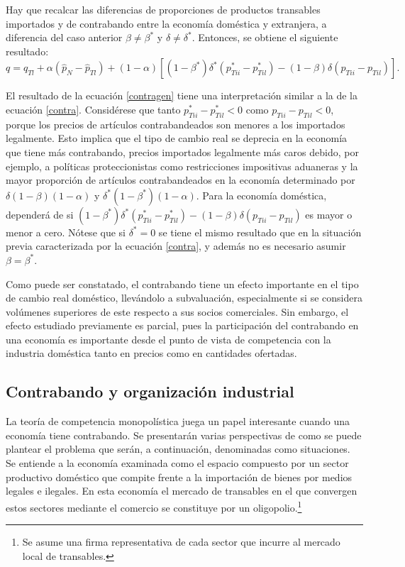 \documentclass[12pt,letterpaper]{article}
\begin{document}

Hay que recalcar las diferencias de proporciones de productos transables importados y de contrabando entre la economía doméstica y extranjera, a diferencia del caso anterior $\beta \neq \beta^*$ y $\delta \neq \delta^*$. Entonces, se obtiene el siguiente resultado:
\begin{equation}\label{contragen}
q=q_{Tl}+\alpha (\hat{p}_{N} - \hat{p}_{Tl}) + (1-\alpha)[(1-\beta^*)\delta^* (p_{Tii}^*-p_{Til}^*)-(1-\beta)\delta (p_{Tii}-p_{Til})].
\end{equation}

El resultado de la ecuación \ref{contragen} tiene una interpretación similar a la de la ecuación \ref{contra}. Considérese que tanto $p_{Tii}^*-p_{Til}^*<0$ como $p_{Tii}-p_{Til}<0$, porque los precios de artículos contrabandeados son menores a los importados legalmente. Esto implica que el tipo de cambio real se deprecia en la economía que tiene más contrabando, precios importados legalmente más caros debido, por ejemplo, a políticas proteccionistas como restricciones impositivas aduaneras y la mayor proporción de artículos contrabandeados en la economía determinado por $\delta(1-\beta)(1-\alpha)$ y $\delta^*(1-\beta^*)(1-\alpha)$. Para la economía doméstica, dependerá de si $(1-\beta^*)\delta^* (p_{Tii}^*-p_{Til}^*)-(1-\beta)\delta (p_{Tii}-p_{Til})$ es mayor o menor a cero. Nótese que si $\delta^*=0$ se tiene el mismo resultado que en la situación previa caracterizada por la ecuación \ref{contra}, y además no es necesario asumir $\beta=\beta^*$.

Como puede ser constatado, el contrabando tiene un efecto importante en el tipo de cambio real doméstico, llevándolo a subvaluación, especialmente si se considera volúmenes superiores de este respecto a sus socios comerciales. Sin embargo, el efecto estudiado previamente es parcial, pues la participación del contrabando en una economía es importante desde el punto de vista de competencia con la industria doméstica tanto en precios como en cantidades ofertadas.

\subsection{Contrabando y organización industrial}
La teoría de competencia monopolística juega un papel interesante cuando una economía tiene contrabando. Se presentarán varias perspectivas de como se puede plantear el problema que serán, a continuación, denominadas como situaciones. Se entiende a la economía examinada como el espacio compuesto por un sector productivo doméstico que compite frente a la importación de bienes por medios legales e ilegales. En esta economía el mercado de transables en el que convergen estos sectores mediante el comercio se constituye por un oligopolio.\footnote{Se asume una firma representativa de cada sector que incurre al mercado local de transables.}
\end{document}

